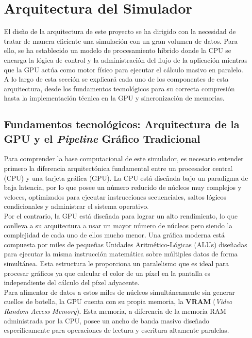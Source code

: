 \section{Arquitectura del Simulador}
    El disño de la arquitectura de este proyecto se ha dirigido con la necesidad de tratar de manera eficiente una simulación con un gran volumen de datos. Para ello, se ha establecido un modelo de procesamiento híbrido donde la CPU se encarga la lógica de control y la administración del flujo de la aplicación mientras que la GPU actúa como motor físico para ejecutar el cálculo masivo en paralelo. A lo largo de esta sección se explicará cada uno de los componentes de esta arquitectura, desde los fundamentos tecnológicos para su correcta compresión hasta la implementación técnica en la GPU y sincronización de memorias.  

    \subsection[\textit{Pipeline} Gráfico]{Fundamentos tecnológicos: Arquitectura de la GPU y el \textit{Pipeline} Gráfico Tradicional}
        
        Para comprender la base computacional de este simulador, es necesario entender primero la diferencia arquitectónica fundamental entre un procesador central (CPU) y una tarjeta gráfica (GPU). La CPU está diseñada bajo un paradigma de baja latencia, por lo que posee un número reducido de núcleos muy complejos y veloces, optimizados para ejecutar instrucciones secuenciales, saltos lógicos condicionales y administrar el sistema operativo.\\
        
        Por el contrario, la GPU está diseñada para lograr un alto rendimiento, lo que conlleva a su arquitectura a usar un mayor número de núcleos pero siendo la complejidad de cada uno de ellos mucho menor. Una gráfica moderna está compuesta por miles de pequeñas Unidades Aritmético-Lógicas (ALUs) diseñadas para ejecutar la misma instrucción matemática sobre múltiples datos de forma simultánea. Esta estructura le proporciona un paralelismo que es  ideal para procesar gráficos ya que calcular el color de un píxel en la pantalla es independiente del cálculo del píxel adyacente\cite{foley2014computer}.\\

        Para alimentar de datos a estos miles de núcleos simultáneamente sin generar cuellos de botella, la GPU cuenta con su propia memoria, la \textbf{VRAM} (\textit{Video Random Access Memory}). Esta memoria, a diferencia de la memoria RAM administrada por la CPU, posee un ancho de banda masivo diseñado específicamente para operaciones de lectura y escritura altamente paralelas.\\
        
